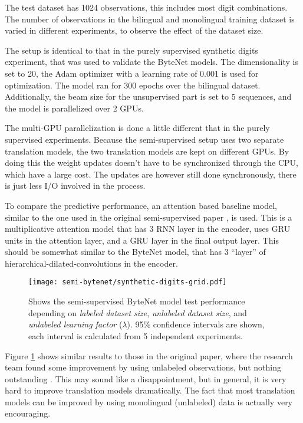 The test dataset has 1024 observations, this includes most digit combinations. The number of observations in the bilingual and monolingual training dataset is varied in different experiments, to observe the effect of the dataset size.

The setup is identical to that in the purely supervised synthetic digits experiment, that was used to validate the ByteNet models. The dimensionality is set to 20, the Adam optimizer with a learning rate of 0.001 is used for optimization. The model ran for 300 epochs over the bilingual dataset. Additionally, the beam size for the unsupervised part is set to 5 sequences, and the model is parallelized over 2 GPUs.

The multi-GPU parallelization is done a little different that in the purely supervised experiments. Because the semi-supervised setup uses two separate translation models, the two translation models are kept on different GPUs. By doing this the weight updates doesn't have to be synchronized through the CPU, which have a large cost. The updates are however still done synchronously, there is just less I/O involved in the process.

To compare the predictive performance, an attention based baseline model, similar to the one used in the original semi-supervised paper \cite{semi-supervised}, is used. This is a multiplicative attention model \cite{multiplicative-attention} that has 3 RNN layer in the encoder, uses GRU units in the attention layer, and a GRU layer in the final output layer. This should be somewhat similar to the ByteNet model, that has 3 ``layer'' of hierarchical-dilated-convolutions in the encoder.

\begin{figure}[h]
    \centering
    \texttt{[image: semi-bytenet/synthetic-digits-grid.pdf]}
    \caption{Shows the semi-supervised ByteNet model test performance depending on \textit{labeled dataset size}, \textit{unlabeled dataset size}, and \textit{unlabeled learning factor} ($\lambda$). 95\% confidence intervals are shown, each interval is calculated from 5 independent experiments.}
     \label{fig:result:semi-bytenet:missrate}
\end{figure}

Figure \ref{fig:result:semi-bytenet:missrate} shows similar results to those in the original paper, where the research team found some improvement by using unlabeled observations, but nothing outstanding \cite{semi-supervised}. This may sound like a disappointment, but in general, it is very hard to improve translation models dramatically. The fact that most translation models can be improved by using monolingual (unlabeled) data is actually very encouraging.

